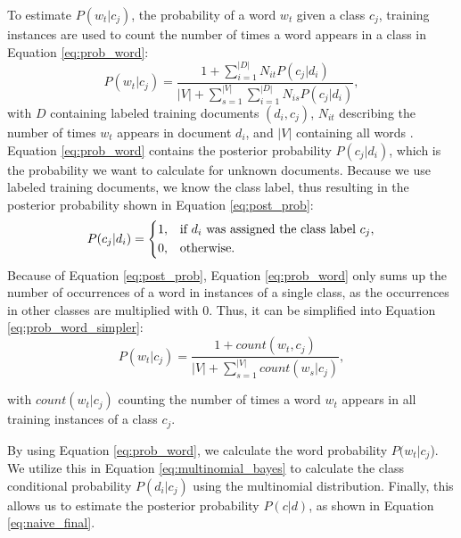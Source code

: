         To estimate $P(w_t|c_j)$, the probability of a word $w_t$ given a class $c_j$, training instances are used to count the number of times a word appears in a class in Equation \eqref{eq:prob_word}:
        \begin{equation}
            \label{eq:prob_word}
                P(w_t|c_j) = \frac{1 + \sum_{i=1}^{|D|}N_{it} P(c_j|d_i)}{|V| + \sum_{s=1}^{|V|} \sum_{i=1}^{|D|}N_{is} P (c_j|d_i)}, 
        \end{equation}
        with $D$ containing labeled training documents $(d_i,c_j)$, $N_{it}$ describing the number of times $w_t$ appears in document $d_i$, and $|V|$ containing all words \cite{Mccallum1998}.
        Equation \eqref{eq:prob_word} contains the posterior probability $P(c_j|d_i)$, which is the probability we want to calculate for unknown documents. Because we use labeled training documents, we know the class label, thus resulting in the posterior probability shown in Equation \eqref{eq:post_prob}:
        \begin{equation}
                \label{eq:post_prob}
                P(c_j|d_i)= 
                \begin{dcases}
                1,& \text{if } d_i \text{ was assigned the class label } c_j, \\
                0,              & \text{otherwise.}
        \end{dcases}
        \end{equation}
        Because of Equation \eqref{eq:post_prob}, Equation \eqref{eq:prob_word} only sums up the number of occurrences of a word in instances of a single class, as the occurrences in other classes are multiplied with 0. Thus, it can be simplified into Equation \eqref{eq:prob_word_simpler}:
                \begin{equation}
            \label{eq:prob_word_simpler}
                P(w_t|c_j) = \frac{1 + count(w_t, c_j)}{|V| + \sum_{s=1}^{|V|}count(w_s|c_j)}, 
        \end{equation}

        with $count(w_t|c_j)$ counting the number of times a word $w_t$ appears in all training instances of a class $c_j$.
        
        By using Equation \eqref{eq:prob_word}, we calculate the word probability $P(w_t|c_j$). We utilize this in Equation \eqref{eq:multinomial_bayes} to calculate the class conditional probability $P(d_i|c_j)$ using the multinomial distribution. Finally, this allows us to estimate the posterior probability $P(c|d)$, as shown in Equation \eqref{eq:naive_final}.
        
